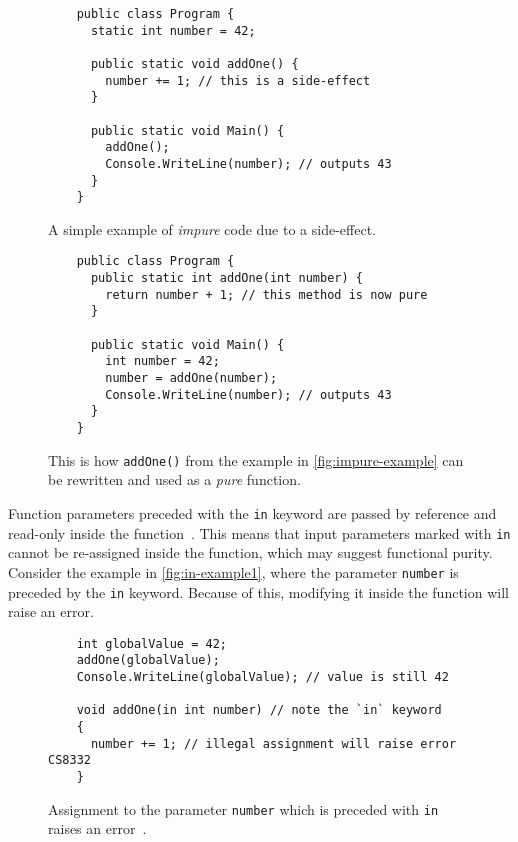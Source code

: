 \documentclass[a4paper,12pt]{article}
\begin{document}
\begin{figure}[H]
  \centering
  \begin{lstlisting}
    public class Program {
      static int number = 42;

      public static void addOne() {
        number += 1; // this is a side-effect
      }

      public static void Main() {
        addOne();
        Console.WriteLine(number); // outputs 43
      }
    }
  \end{lstlisting}
  \caption{A simple example of \textit{impure} code due to a side-effect.}
  \label{fig:impure-example}
\end{figure}

\begin{figure}[H]
  \centering
  \begin{lstlisting}
    public class Program {
      public static int addOne(int number) {
        return number + 1; // this method is now pure
      }

      public static void Main() {
        int number = 42;
        number = addOne(number);
        Console.WriteLine(number); // outputs 43
      }
    }
  \end{lstlisting}
  \caption{This is how \texttt{addOne()} from the example in \autoref{fig:impure-example} can be rewritten and used as a \textit{pure} function.}
  \label{fig:pure-example}
\end{figure}

Function parameters preceded with the \texttt{in} keyword are passed by reference and read-only inside the function~\cite{microsoft-in-modifier}. This means that input parameters marked with \texttt{in} cannot be re-assigned inside the function, which may suggest functional purity. Consider the example in \autoref{fig:in-example1}, where the parameter \texttt{number} is preceded by the \texttt{in} keyword. Because of this, modifying it inside the function will raise an error.

\begin{figure}[H]
  \centering
  \begin{lstlisting}
    int globalValue = 42;
    addOne(globalValue);
    Console.WriteLine(globalValue); // value is still 42

    void addOne(in int number) // note the `in` keyword
    {
      number += 1; // illegal assignment will raise error CS8332
    }
  \end{lstlisting}
  \caption{Assignment to the parameter \texttt{number} which is preceded with \texttt{in} raises an error~\cite{microsoft-in-modifier}.}
  \label{fig:in-example1}
\end{figure}
\end{document}
